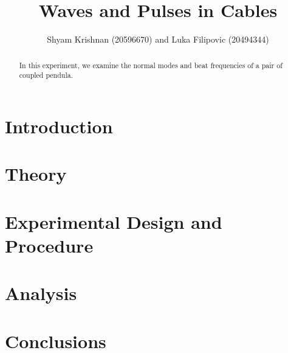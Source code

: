 \documentclass[letterpaper, 10pt, conference]{ieeeconf}
\title{\LARGE \bf Waves and Pulses in Cables}
\author{Shyam Krishnan (20596670) and Luka Filipovic (20494344)}
\numberwithin{equation}{section}
\begin{document}
\maketitle
\thispagestyle{empty}
\pagestyle{empty}

\begin{abstract}
In this experiment, we examine the normal modes and beat frequencies of a pair of coupled pendula. 
\end{abstract}

\section{Introduction}


\section{Theory\label{sec:theory}}


\section{Experimental Design and Procedure}


\section{Analysis}


\section{Conclusions}


\printbibliography
\end{document}
